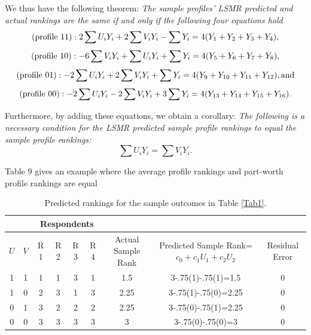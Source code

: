 \documentclass[a4paper, 12pt]{article}
\begin{document}
{\flushleft We} thus have the following theorem: \emph{The sample profiles' LSMR predicted and actual rankings are the same if and only if the following four equations hold}
\begin{equation}
\textup{(profile 11)} :  2\sum U_iY_i + 2\sum V_iY_i - \sum Y_i = 4( Y_1+Y_2+Y_3+Y_4 ),
\end{equation}
\label{eq:14}
\begin{equation}
\textup{(profile 10)} :  -6 \sum V_iY_i + \sum U_iY_i + \sum Y_i = 4( Y_5+Y_6+Y_7+Y_8 ),
\end{equation}
\label{eq:15}
\begin{equation}
\textup{(profile 01)} : -2\sum U_iY_i + 2\sum V_iY_i + \sum Y_i = 4(Y_9+Y_{10}+Y_{11}+Y_{12} ), \textup{and}
\end{equation}
\label{eq:16}
\begin{equation}
\textup{(profile 00)} : -2\sum U_iY_i - 2\sum V_iY_i +3 \sum Y_i = 4(Y_{13}+Y_{14}+Y_{15}+Y_{16} ).
\end{equation}
\label{eq:17}

{\flushleft Furthermore}, by adding these equations, we obtain a corollary:
\emph{The following is a necessary condition for the LSMR predicted sample profile rankings to equal the sample profile rankings:}
\begin{equation}
\sum U_iY_i = \sum V_iY_i.
\label{cor}
\end{equation}


Table 9 gives an example where the average profile rankings and part-worth profile rankings are equal

\begin{table}[!htpb]
	\centering
	\scriptsize
	\begin{tabular}{cc|cccc|c|c|c}
		\multicolumn{2}{c}{} &\multicolumn{4}{c}{Respondents}\\\hline
		$U$ & $V$ & R 1&  R 2& R 3& R 4 &Actual Sample Rank&Predicted Sample Rank=$c_0+c_1U_1+c_2U_2$ & Residual Error\\  \hline
		1 &1&1&1&3&1&1.5&3-.75(1)-.75(1)=1.5&0\\
		1 &0&2&3&1&3&2.25&3-.75(1)-.75(0)=2.25&0 \\
		0 &1&3&2&2&2&2.25 &3-.75(0)-.75(1)=2.25&0 \\
		0 &0&3&3&3&3& 3 &3-.75(0)-.75(0)=3&0\\\hline
	\end{tabular}
	\caption{{\small Predicted rankings for the sample outcomes in Table \ref{Tab1}.}}
	\label{Tab9}
\end{table}
\end{document}
